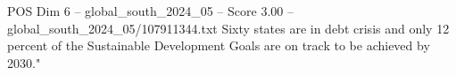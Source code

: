 \begin{textsample}{POS Dim 6 – global\_south\_2024\_05 – Score 3.00 – global\_south\_2024\_05/107911344.txt}
Sixty states are in debt crisis and only 12 percent of the Sustainable Development Goals are on track to be achieved by 2030."

\end{textsample}
